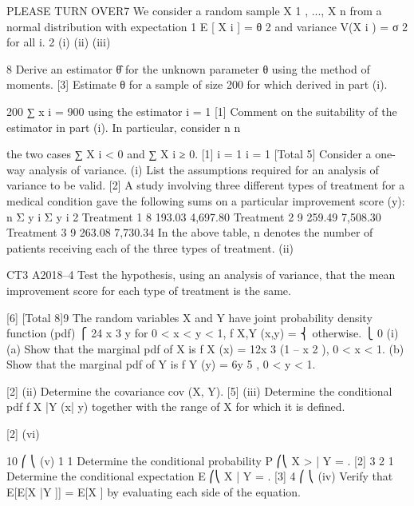 \documentclass[a4paper,12pt]{article}
\begin{document}
\begin{enumerate}
[1]
[Total 5]
PLEASE TURN OVER7
We consider a random sample X 1 , ..., X n from a normal distribution with expectation
1
E [ X i ] = θ 2 and variance V(X i ) = σ 2 for all i.
2
(i)
(ii)
(iii)


8
Derive an estimator θ̂ for the unknown parameter θ using the method of
moments.
[3]
Estimate θ for a sample of size 200 for which
derived in part (i).

200
∑ x i = 900 using the estimator
i = 1
[1]
Comment on the suitability of the estimator in part (i). In particular, consider
n
n


the two cases ∑ X i < 0 and ∑ X i ≥ 0.
[1]
i = 1
i = 1
[Total 5]
Consider a one-way analysis of variance.
(i)
List the assumptions required for an analysis of variance to be valid.
[2]
A study involving three different types of treatment for a medical condition gave the
following sums on a particular improvement score (y):
n Σ y i Σ y i 2
Treatment 1 8 193.03 4,697.80
Treatment 2 9 259.49 7,508.30
Treatment 3 9 263.08 7,730.34
In the above table, n denotes the number of patients receiving each of the three types
of treatment.
(ii)


CT3 A2018–4
Test the hypothesis, using an analysis of variance, that the mean improvement
score for each type of treatment is the same.

[6]
[Total 8]9
The random variables X and Y have joint probability density function (pdf)
⎧ 24 x 3 y for 0 < x < y < 1,
f X,Y (x,y) = ⎨
otherwise.
⎩ 0
(i)
(a)
Show that the marginal pdf of X is
f X   (x) = 12x 3 (1 – x 2 ), 0 <
x < 1.
(b)
Show that the marginal pdf of Y is f Y   (y) = 6y 5 , 0 < y < 1.

[2]
(ii) Determine the covariance cov (X, Y).
[5]
(iii) Determine the conditional pdf f X |Y (x| y) together with the range of X for which
it is defined. 

[2]
(vi)


10
⎛
⎝
(v)
1
1
Determine the conditional probability P ⎛⎝ X > | Y = .
[2]
3
2
1
Determine the conditional expectation E ⎛⎝ X | Y = .
[3]
4   
⎛
⎝
(iv)
Verify that E[E[X |Y ]] = E[X ] by evaluating each side of the equation.


\end{enumerate}
\end{document}
